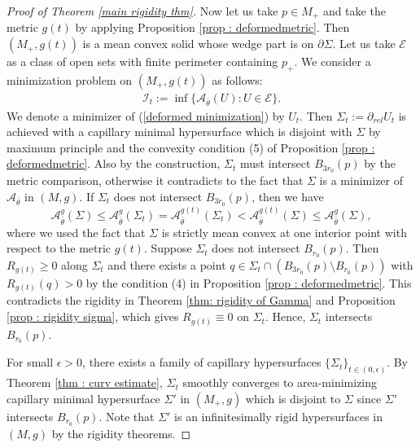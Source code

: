\documentclass[11pt,letterpaper]{amsart}
\begin{document}
\begin{proof}[Proof of Theorem \ref{main rigidity thm}]
Now let us take $p \in M_{+}$ and take the metric $g(t)$ by applying Proposition \ref{prop : deformedmetric}. Then $(M_{+}, g(t))$ is a mean convex solid whose wedge part is on $\partial \Sigma$. Let us take $\mathcal{E}$ as a class of open sets with finite perimeter containing $p_{+}$. We consider a minimization problem on $(M_{+}, g(t))$ as follows: 
\begin{align} \label{deformed minimization}
    \mathcal I_{t}:=\inf\{\mathcal A_{\bar{\theta}}(U): U\in\mathcal E\}.
\end{align}
We denote a minimizer of (\ref{deformed minimization}) by $U_{t}$. Then $\Sigma_{t}:=\partial_{rel}U_{t}$ is achieved with a capillary minimal hypersurface which is disjoint with $\Sigma$ by maximum principle and the convexity condition (5) of Proposition \ref{prop : deformedmetric}. Also by the construction, $\Sigma_{t}$ must intersect $B_{3r_{0}}(p)$ by the metric comparison, otherwise it contradicts to the fact that $\Sigma$ is a minimizer of $\mathcal{A}_{\bar{\theta}}$ in $(M,g)$. If $\Sigma_t$ does not intersect $B_{3r_0}(p)$, then we have 
\[
\mathcal A^g_{\bar{\theta}}(\Sigma)\leq \mathcal A_{\bar{\theta}}^g(\Sigma_t)=\mathcal A_{\bar{\theta}}^{g(t)}(\Sigma_t)< \mathcal A_{\bar{\theta}}^{g(t)}(\Sigma)\leq \mathcal A_{\bar{\theta}}^g(\Sigma),
\]
where we used the fact that $\Sigma$ is strictly mean convex at one interior point with respect to the metric $g(t)$. Suppose $\Sigma_{t}$ does not intersect $B_{r_0}(p)$. Then $R_{g(t)} \ge 0$ along $\Sigma_{t}$ and there exists a point $q \in \Sigma_{t} \cap (B_{3r_0}(p)\setminus B_{r_0}(p))$ with $R_{g(t)}(q) > 0$ by the condition (4) in Proposition \ref{prop : deformedmetric}. This contradicts the rigidity in Theorem \ref{thm: rigidity of Gamma} and Proposition \ref{prop : rigidity sigma}, which gives $R_{g(t)} \equiv 0$ on $\Sigma_{t}$. Hence, $\Sigma_{t}$ intersects $B_{r_0}(p)$.

For small $\epsilon>0$, there exists a family of capillary hypersurfaces $\{ \Sigma_{t} \}_{t \in (0,\epsilon)}$. By Theorem \ref{thm : curv estimate}, $\Sigma_{t}$ smoothly converges to area-minimizing capillary minimal hypersurface $\Sigma'$ in $(M_{+},g)$ which is disjoint to $\Sigma$ since $\Sigma'$ intersects $B_{r_{0}}(p)$. Note that $\Sigma'$ is an infinitesimally rigid hypersurfaces in $(M,g)$ by the rigidity theorems.


\end{proof}
\end{document}

